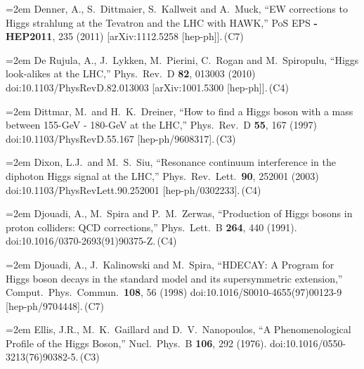 \documentclass[letter,12pt]{article}
\def\xbibitem#1#2#3{\noindent\hangindent=2em #2\,(#3)}
\begin{document}
\xbibitem{Denner:2011rn}{Denner, A., S.~Dittmaier, S.~Kallweit and A.~Muck,
  ``EW corrections to Higgs strahlung at the Tevatron and the LHC with HAWK,''
  PoS EPS {\bf -HEP2011}, 235 (2011)
  [arXiv:1112.5258 [hep-ph]].}{C7}
  
\xbibitem{DeRujula:2010ys}{De Rujula, A., J.~Lykken, M.~Pierini, C.~Rogan and M.~Spiropulu,
  ``Higgs look-alikes at the LHC,''
  Phys.\ Rev.\ D {\bf 82}, 013003 (2010)
  doi:10.1103/PhysRevD.82.013003
  [arXiv:1001.5300 [hep-ph]].}{C4}
  
\xbibitem{Dittmar:1996ss}{Dittmar, M.\ and H.~K.~Dreiner,
  ``How to find a Higgs boson with a mass between 155-GeV - 180-GeV at the LHC,''
  Phys.\ Rev.\ D {\bf 55}, 167 (1997)
  doi:10.1103/PhysRevD.55.167
  [hep-ph/9608317].}{C3}
  
\xbibitem{Dixon:2003yb}{Dixon, L.J.\ and M.~S.~Siu,
  ``Resonance continuum interference in the diphoton Higgs signal at the LHC,''
  Phys.\ Rev.\ Lett.\  {\bf 90}, 252001 (2003)
  doi:10.1103/PhysRevLett.90.252001
  [hep-ph/0302233].}{C4}

\xbibitem{Djouadi:1991tka}{Djouadi, A., M.~Spira and P.~M.~Zerwas,
  ``Production of Higgs bosons in proton colliders: QCD corrections,''
  Phys.\ Lett.\ B {\bf 264}, 440 (1991).
  doi:10.1016/0370-2693(91)90375-Z.}{C4}

\xbibitem{Djouadi:1997yw}{Djouadi, A., J.~Kalinowski and M.~Spira,
  ``HDECAY: A Program for Higgs boson decays in the standard model and its supersymmetric extension,''
  Comput.\ Phys.\ Commun.\  {\bf 108}, 56 (1998)
  doi:10.1016/S0010-4655(97)00123-9
  [hep-ph/9704448].}{C7}

\xbibitem{Ellis:1975ap}{Ellis, J.R., M.~K.~Gaillard and D.~V.~Nanopoulos,
  ``A Phenomenological Profile of the Higgs Boson,''
  Nucl.\ Phys.\ B {\bf 106}, 292 (1976).
  doi:10.1016/0550-3213(76)90382-5.}{C3}
  
\end{document}
